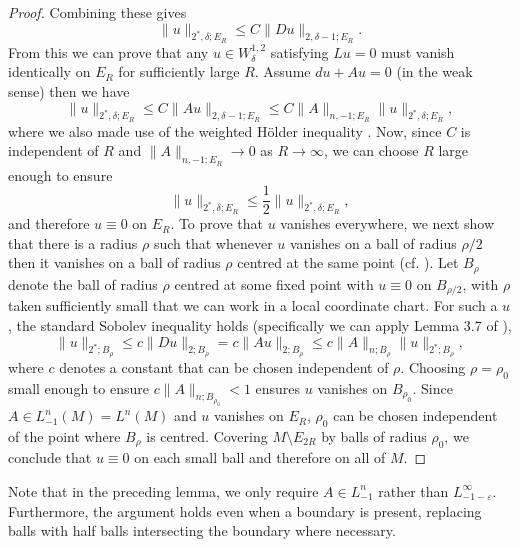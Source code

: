 \documentclass[a4paper,11pt,reqno]{amsart}
\theoremstyle{plain}
\theoremstyle{definition}
\theoremstyle{remark}
\numberwithin{equation}{section}
\begin{document}
\begin{proof}
	Combining these gives
	\begin{equation}
		\|u\|_{2^*,\delta;E_R}\leq C\| Du \|_{2,\delta-1;E_R}.
	\end{equation}
	From this we can prove that any $u\in W^{1,2}_\delta$ satisfying $Lu=0$ must vanish identically on $E_R$ for sufficiently large $R$. Assume $du+Au=0$ (in the weak sense) then we have
	\begin{equation}
		\| u \|_{2^*,\delta;E_R}\leq C\|Au\|_{2,\delta-1;E_R}\leq  C\|A\|_{n,-1;E_R}\| u\|_{2^*,\delta;E_R},
	\end{equation}
	where we also made use of the weighted H\"older inequality \cite[Theorem 1.2]{Bartnik86}. Now, since $C$ is independent of $R$ and $\|A\|_{n,-1;E_R}\to0$ as $R\to\infty$, we can choose $R$ large enough to ensure
	\begin{equation*}
		\| u \|_{2^*,\delta;E_R}\leq \frac12\| u\|_{2^*,\delta;E_R},
	\end{equation*}
	and therefore $u\equiv0$ on $E_R$. To prove that $u$ vanishes everywhere, we next show that there is a radius $\rho$ such that whenever $u$ vanishes on a ball of radius $\rho/2$ then it vanishes on a ball of radius $\rho$ centred at the same point (cf. \cite[Lemma 3.8]{Bartnik2005PhaseSpace}). Let $B_\rho$ denote the ball of radius $\rho$ centred at some fixed point with $u\equiv0$ on $B_{\rho/2}$, with $\rho$ taken sufficiently small that we can work in a local coordinate chart. For such a $u$, the standard Sobolev inequality holds (specifically we can apply Lemma 3.7 of \cite{Bartnik2005PhaseSpace}),
	\begin{equation*}
		\|u\|_{2^*;B_\rho}\leq c\|Du\|_{2;B_\rho}=c\|Au\|_{2;B_\rho}\leq c\|A\|_{n;B_\rho}\|u\|_{2^*;B_\rho},
	\end{equation*}
	where $c$ denotes a constant that can be chosen independent of $\rho$. Choosing $\rho=\rho_0$ small enough to ensure $c\|A\|_{n;B_{\rho_0}}<1$ ensures $u$ vanishes on $B_{\rho_0}$. Since $A\in L^n_{-1}(M)=L^n(M)$ and $u$ vanishes on $E_R$, $\rho_0$ can be chosen independent of the point where $B_\rho$ is centred. Covering $M\setminus E_{2R}$ by balls of radius $\rho_0$, we conclude that $u\equiv0$ on each small ball and therefore on all of $M$.
\end{proof} 
Note that in the preceding lemma, we only require $A\in L^n_{-1}$ rather than $L^\infty_{-1-\varepsilon}$. Furthermore, the argument holds even when a boundary is present, replacing balls with half balls intersecting the boundary where necessary.
\end{document}
